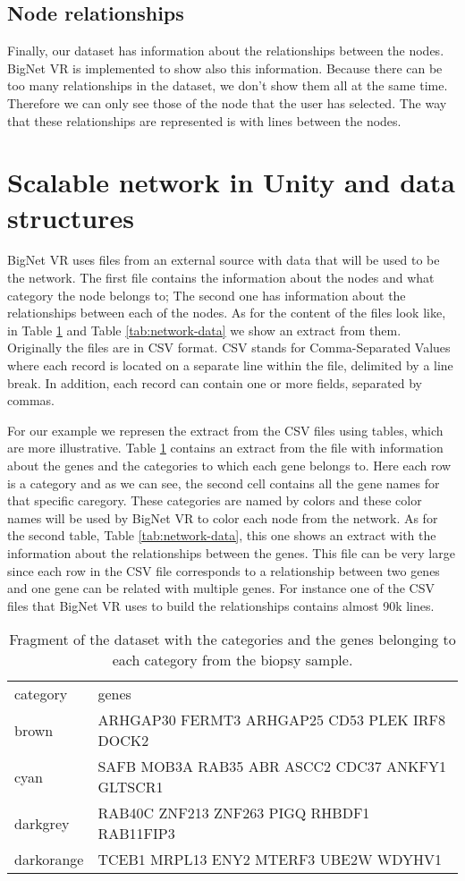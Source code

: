 \subsection{Node relationships}
Finally, our dataset has information about the relationships between the nodes. BigNet VR is implemented to show also this information. Because there can be too many relationships in the dataset, we don't show them all at the same time. Therefore we can only see those of the node that the user has selected. The way that these relationships are represented is with lines between the nodes.


\section{Scalable network in Unity and data structures}
BigNet VR uses files from an external source with data that will be used to be the network. The first file contains the information about the nodes and what category the node belongs to; The second one has information about the relationships between each of the nodes. As for the content of the files look like, in Table \ref{tab:categories-data} and Table \ref{tab:network-data} we show an extract from them. Originally the files are in CSV format. CSV\cite{csv} stands for Comma-Separated Values where each record is located on a separate line within the file, delimited by a line break. In addition, each record can contain one or more fields, separated by commas.

For our example we represen the extract from the CSV files using tables, which are more illustrative. Table \ref{tab:categories-data} contains an extract from the file with information about the genes and the categories to which each gene belongs to. Here each row is a category and as we can see, the second cell contains all the gene names for that specific caregory. These categories are named by colors and these color names will be used by BigNet VR to color each node from the network. As for the second table, Table \ref{tab:network-data}, this one shows an extract with the information about the relationships between the genes. This file can be very large since each row in the CSV file corresponds to a relationship between two genes and one gene can be related with multiple genes. For instance one of the CSV files that BigNet VR uses to build the relationships contains almost 90k lines.

\begin{table}[h!]
\centering
\begin{tabular}{ll}
\hline
category & genes          \\
brown   & ARHGAP30 FERMT3 ARHGAP25 CD53 PLEK IRF8 DOCK2\\
cyan  & SAFB MOB3A RAB35 ABR ASCC2 CDC37 ANKFY1 GLTSCR1\\
darkgrey  & RAB40C ZNF213 ZNF263 PIGQ RHBDF1 RAB11FIP3\\
darkorange  & TCEB1 MRPL13 ENY2 MTERF3 UBE2W WDYHV1\\
\hline
\end{tabular}
\caption{Fragment of the dataset with the categories and the genes belonging to each category from the biopsy sample.}
\label{tab:categories-data}
\end{table}

